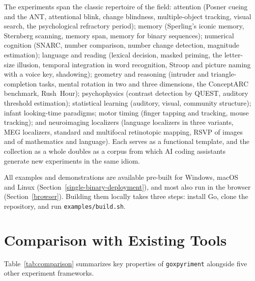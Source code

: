 \documentclass[doc,a4paper,floatsintext]{apa7}
\begin{document}
The experiments span the classic repertoire of the field: attention
(Posner cueing and the ANT, attentional blink, change blindness,
multiple-object tracking, visual search, the psychological refractory
period); memory (Sperling's iconic memory, Sternberg scanning, memory
span, memory for binary sequences); numerical cognition (SNARC,
number comparison, number change detection, magnitude estimation);
language and reading (lexical decision, masked priming, the
letter-size illusion, temporal integration in word recognition,
Stroop and picture naming with a voice key, shadowing); geometry and
reasoning (intruder and triangle-completion tasks, mental rotation in
two and three dimensions, the ConceptARC benchmark, Rush~Hour);
psychophysics (contrast detection by QUEST, auditory threshold
estimation); statistical learning (auditory, visual, community
structure); infant looking-time paradigms; motor timing (finger
tapping and tracking, mouse tracking); and neuroimaging localizers
(language localizers in three variants, MEG localizers, standard and
multifocal retinotopic mapping, RSVP of images and of mathematics and
language). Each serves as a functional template, and the collection
as a whole doubles as a corpus from which AI coding assistants
generate new experiments in the same idiom.

All examples and demonstrations are available pre-built for Windows,
macOS and Linux (Section~\ref{single-binary-deployment}), and most
also run in the browser (Section~\ref{browser}). Building them
locally takes three steps: install Go, clone the repository, and run
\texttt{examples/build.sh}.



\section{Comparison with Existing Tools}\label{comparison-with-existing-tools}

Table~\ref{tab:comparison} summarizes key properties of \texttt{goxpyriment}
alongside five other experiment frameworks.
\end{document}

